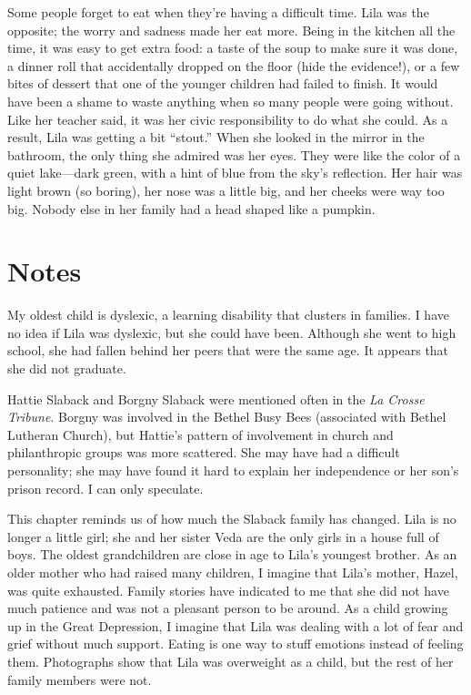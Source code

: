 \documentclass[
  letterpaper,
]{book}
\begin{document}
Some people forget to eat when they're having a difficult time. Lila was
the opposite; the worry and sadness made her eat more. Being in the
kitchen all the time, it was easy to get extra food: a taste of the soup
to make sure it was done, a dinner roll that accidentally dropped on the
floor (hide the evidence!), or a few bites of dessert that one of the
younger children had failed to finish. It would have been a shame to
waste anything when so many people were going without. Like her teacher
said, it was her civic responsibility to do what she could. As a result,
Lila was getting a bit ``stout.'' When she looked in the mirror in the
bathroom, the only thing she admired was her eyes. They were like the
color of a quiet lake---dark green, with a hint of blue from the sky's
reflection. Her hair was light brown (so boring), her nose was a little
big, and her cheeks were way too big. Nobody else in her family had a
head shaped like a pumpkin.

\section{Notes}\label{notes-11}

My oldest child is dyslexic, a learning disability that clusters in
families. I have no idea if Lila was dyslexic, but she could have been.
Although she went to high school, she had fallen behind her peers that
were the same age. It appears that she did not graduate.

Hattie Slaback and Borgny Slaback were mentioned often in the \emph{La
Crosse Tribune}. Borgny was involved in the Bethel Busy Bees (associated
with Bethel Lutheran Church), but Hattie's pattern of involvement in
church and philanthropic groups was more scattered. She may have had a
difficult personality; she may have found it hard to explain her
independence or her son's prison record. I can only speculate.

This chapter reminds us of how much the Slaback family has changed. Lila
is no longer a little girl; she and her sister Veda are the only girls
in a house full of boys. The oldest grandchildren are close in age to
Lila's youngest brother. As an older mother who had raised many
children, I imagine that Lila's mother, Hazel, was quite exhausted.
Family stories have indicated to me that she did not have much patience
and was not a pleasant person to be around. As a child growing up in the
Great Depression, I imagine that Lila was dealing with a lot of fear and
grief without much support. Eating is one way to stuff emotions instead
of feeling them. Photographs show that Lila was overweight as a child,
but the rest of her family members were not.
\end{document}
